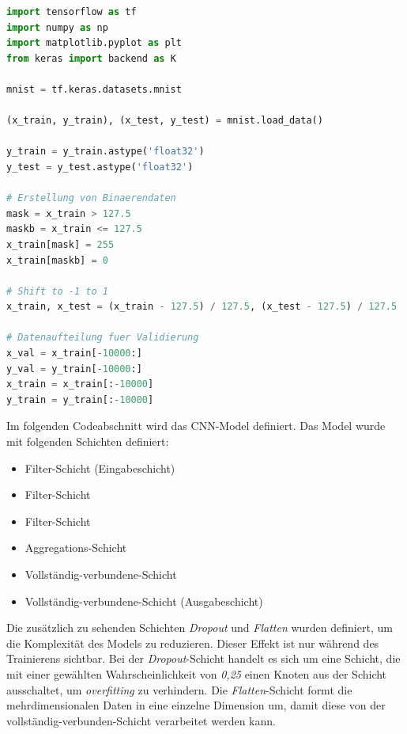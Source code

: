 \begin{minipage}{\textwidth}
    \begin{lstlisting}[language=Python, caption=Pythoncode zur Testvorbereitung vom CNN, label=lst:test_prep_cnn]
import tensorflow as tf
import numpy as np
import matplotlib.pyplot as plt
from keras import backend as K

mnist = tf.keras.datasets.mnist

(x_train, y_train), (x_test, y_test) = mnist.load_data()

y_train = y_train.astype('float32')
y_test = y_test.astype('float32')

# Erstellung von Binaerendaten 
mask = x_train > 127.5
maskb = x_train <= 127.5
x_train[mask] = 255
x_train[maskb] = 0

# Shift to -1 to 1
x_train, x_test = (x_train - 127.5) / 127.5, (x_test - 127.5) / 127.5

# Datenaufteilung fuer Validierung
x_val = x_train[-10000:]
y_val = y_train[-10000:]
x_train = x_train[:-10000]
y_train = y_train[:-10000]

	\end{lstlisting}
\end{minipage}

Im folgenden Codeabschnitt wird das CNN-Model definiert. Das Model wurde mit folgenden Schichten definiert:

\begin{itemize}
    \item Filter-Schicht (Eingabeschicht)
    \item Filter-Schicht
    \item Filter-Schicht
    \item Aggregations-Schicht
    \item Vollständig-verbundene-Schicht
    \item Vollständig-verbundene-Schicht (Ausgabeschicht)
\end{itemize}

Die zusätzlich zu sehenden Schichten \textit{Dropout} und \textit{Flatten} wurden definiert, um die Komplexität des Models zu reduzieren. Dieser Effekt ist nur während des Trainierens sichtbar. Bei der \textit{Dropout}-Schicht handelt es sich um eine Schicht, die mit einer gewählten Wahrscheinlichkeit von \textit{0,25} einen Knoten aus der Schicht ausschaltet, um \textit{overfitting} zu verhindern. Die \textit{Flatten}-Schicht formt die mehrdimensionalen Daten in eine einzelne Dimension um, damit diese von der vollständig-verbunden-Schicht verarbeitet werden kann.

